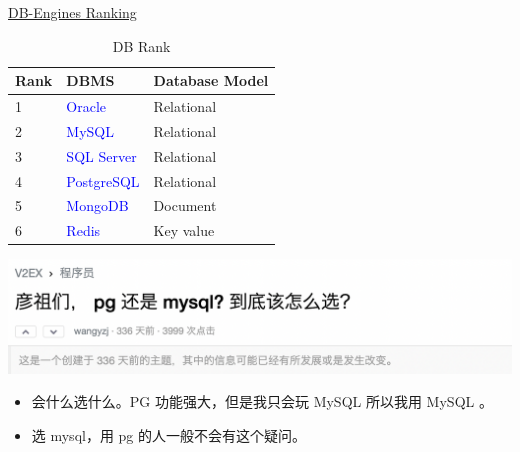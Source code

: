 \documentclass[aspectratio=169, 14pt]{beamer}
\begin{document}
\begin{frame}
	\href{https://db-engines.com/en/ranking}{DB-Engines Ranking}

	\begin{table}
		\caption{DB Rank}
		\begin{tabular}{lll}
			\toprule
			Rank & DBMS                         & Database Model \\
			\midrule
			1    & \textcolor{blue}{Oracle}     & Relational     \\
			2    & \textcolor{blue}{MySQL}      & Relational     \\
			3    & \textcolor{blue}{SQL Server} & Relational     \\
			4    & \textcolor{blue}{PostgreSQL} & Relational     \\
			5    & \textcolor{blue}{MongoDB}    & Document       \\
			6    & \textcolor{blue}{Redis}      & Key value      \\
			\bottomrule
		\end{tabular}
	\end{table}
\end{frame}

\begin{frame}
	\includegraphics[width=.9\paperwidth]{image/pg-mysql1}
	\begin{itemize}
		\item 会什么选什么。PG 功能强大，但是我只会玩 MySQL 所以我用 MySQL 。
		\item 选 mysql，用 pg 的人一般不会有这个疑问。
	\end{itemize}
\end{frame}
\end{document}
